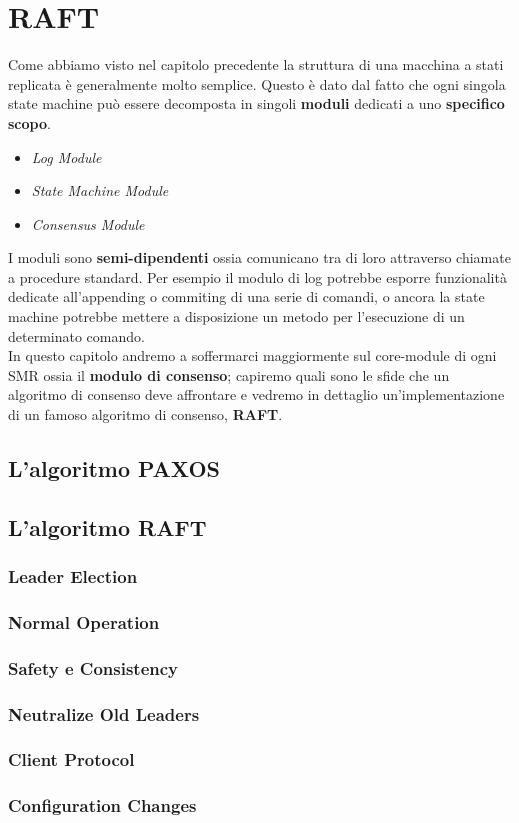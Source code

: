 \chapter{RAFT}
	Come abbiamo visto nel capitolo precedente la struttura di una macchina a stati replicata è generalmente molto semplice. Questo è dato dal fatto che ogni singola state machine può essere decomposta in singoli \textbf{moduli} dedicati a uno \textbf{specifico scopo}.
	\begin{itemize}
		\item{\textit{Log Module}}
		\item{\textit{State Machine Module}}
		\item{\textit{Consensus Module}}
	\end{itemize}
	I moduli sono \textbf{semi-dipendenti} ossia comunicano tra di loro attraverso chiamate a procedure standard. Per esempio il modulo di log potrebbe esporre funzionalità dedicate all'appending o commiting di una serie di comandi, o ancora la state machine potrebbe mettere a disposizione un metodo per l'esecuzione di un determinato comando.\\
	In questo capitolo andremo a soffermarci maggiormente sul core-module di ogni SMR ossia il \textbf{modulo di consenso}; capiremo quali sono le sfide che un algoritmo di consenso deve affrontare e vedremo in dettaglio un'implementazione di un famoso algoritmo di consenso, \textbf{RAFT}.
	\section{L'algoritmo PAXOS}
	\section{L'algoritmo RAFT}
		\subsection{Leader Election}
		\subsection{Normal Operation}
		\subsection{Safety e Consistency}
		\subsection{Neutralize Old Leaders}
		\subsection{Client Protocol}
		\subsection{Configuration Changes}